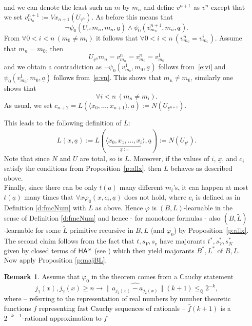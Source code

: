 \documentclass[1p]{elsarticle}
\newcommand{\usftext}[1]{\textsf{\upshape #1}}
\newcommand{\QQ}{\ensuremath{\mathbb{Q}}}
\newcommand{\ha}{\ensuremath{{\usftext{HA}}^\omega}} %
\newcommand{\tup}{\underline} %
\theoremstyle{plain}
\theoremstyle{definition}
\newtheorem{rmk}[thm]{Remark}
\theoremstyle{remark}
\renewenvironment{proof}[1][]{\noindent{\bf Proof{#1}. }}{\nopagebreak[4]{\hspace*{\fill}
  $\Box$              %
 }{\vspace{2ex}}}
\renewcommand{\phi}{\varphi}
\theoremstyle{definition}
\begin{document}
{\begin{proof}
\begin{enumerate}
\[\]
and we can denote the least such an $m$ by $m_n$ and define $\tup v^{n+1}$ as $\tup v^n$ except that we set $v^{n+1}_{m_n}:=Vx_{n+1}(U_{\tup v^n})$. As before this means that
\[ \neg\psi_0(U_{\tup v^n}m_n,m_n,\tup a) \wedge \psi_0(v^{n+1}_{m_n},m_n,\tup a). \tag{vn}\label{e:vn}\]
From $\forall 0<i<n\ ( m_0\neq m_i )$ it follows that $\forall0<i<n\ ( v^n_{m_0}=v^i_{m_0})$. Assume that $m_n = m_0$, then
\[U_{\tup v^n}m_n=v^n_{m_n}=v^n_{m_0}=v^1_{m_0}\]
and we obtain a contradiction as $\neg\psi_0(v^1_{m_0},m_0,\tup a)$ follows from~\eqref{e:vi} and $\psi_0(v^1_{m_0},m_0,\tup a)$ follows from~\eqref{e:vn}. This shows that 
$m_n \neq m_0$, similarly one shows that \[ \forall i<n\ (m_n \neq m_i).\]
As usual, we set $c_{n+2}=L(\langle x_0,\ldots,x_{n+1}\rangle,\tup a):=
N(U_{\tup v^{n+1}})$.
\end{enumerate}
This leads to the following definition of $L$:
\begin{align*}
 L(x,\tup a):= 
 L(\langle \underbrace {x_0,x_1,\ldots,x_i}_{\tup x:=}\rangle,\tup a):=
N(U_{\tup v^{i}}). 
\end{align*}
Note that since $N$ and $U$ are total, so is $L$. 
Moreover, if the values of $i$, $\tup x$, and $c_i$ satisfy the conditions from Proposition~\ref{p:allx}, then $L$ 
behaves as described above.\\
Finally, since there can be only $t(\tup a)$ many different $m_i$'s, it can happen at most $t(\tup a)$ many 
times that $\forall x \phi_0(x,c_i,\tup a)$ does not hold, where
$c_i$ is defined as in Definition \ref{d:fmcNum} with $L$ as above. Hence 
$\varphi$ is $(B,L)$-learnable in the sense of  Definition \ref{d:fmcNum} 
and hence - for monotone formulas - also $(B,\tilde{L})$-learnable 
for some $\tilde{L}$ primitive recursive in $B,L$ (and $\varphi_0$) 
by Proposition~\ref{p:allx}. 
\\ The 
second claim follows from the fact that $t,s_V,s_v$ have majorants $t^*,
s^*_V,s^*_N$ 
given by closed terms of $\ha$ (see \cite{Kohlenbach(book)}) which then 
yield majorants $B^*,L^*$ of $B,L.$ Now apply  
Proposition \ref{p:majBL}.
\end{proof} 
\begin{rmk} \label{simple-L}
Assume that $\varphi_0$  in the theorem comes from a Cauchy statement 
\[ j_1(x),j_2(x)\ge n\to \widehat{\| 
a_{j_1(x)}-a_{j_2(x)}\|}(k+1)\le_{\QQ} 
2^{-k}, \] where -- referring to the representation of real numbers 
by number theoretic functions $f$ representing fast Cauchy sequences of 
rationals -- $\widehat{f}(k+1)$ is a $2^{-k-1}$-rational approximation to $f$ 

\end{rmk}}
\end{document}
